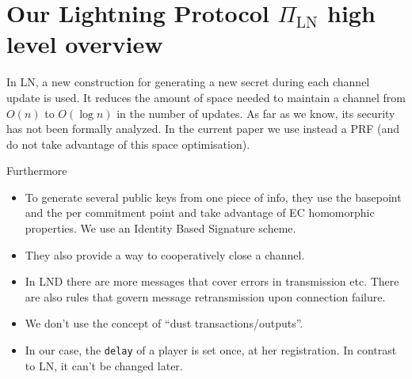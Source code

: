 \section{Our Lightning Protocol $\Pi_{\mathrm{LN}}$ high level overview}

  \begin{remark}

    In LN, a new construction for generating a new secret during each channel
    update is used. It reduces the amount of space needed to maintain a channel
    from $O(n)$ to $O(\log n)$ in the number of updates. As far as we know, its
    security has not been formally analyzed. In the current paper we use instead
    a PRF (and do not take advantage of this space optimisation).

    Furthermore
    \begin{itemize}
      \item To generate several public keys from one piece of info, they use the
      basepoint and the per commitment point and take advantage of EC homomorphic
      properties. We use an Identity Based Signature scheme.
      \item They also provide a way to cooperatively close a channel.
      \item In LND there are more messages that cover errors in transmission etc.
      There are also rules that govern message retransmission upon connection
      failure.
      \item We don't use the concept of ``dust transactions/outputs''.
      \item In our case, the \texttt{delay} of a player is set once, at her
      registration. In contrast to LN, it can't be changed later.
    \end{itemize}
  \end{remark}
